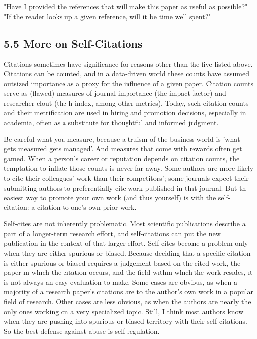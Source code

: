 "Have I provided the references that will make this paper as useful as possible?" "If the reader looks up a given reference, will it be time well spent?"

\subsection*{5.5 More on Self-Citations}
Citations sometimes have significance for reasons other than the five listed above. Citations can be counted, and in a data-driven world these counts have assumed outsized importance as a proxy for the influence of a given paper. Citation counts serve as (flawed) measures of journal importance (the impact factor) and researcher clout (the h-index, among other metrics). Today, such citation counts and their metrification are used in hiring and promotion decisions, especially in academia, often as a substitute for thoughtful and informed judgment.

Be careful what you measure, because a truism of the business world is 'what gets measured gets managed'. And measures that come with rewards often get gamed. When a person's career or reputation depends on citation counts, the temptation to inflate those counts is never far away. Some authors are more likely to cite their colleagues' work than their competitors'; some journals expect their submitting authors to preferentially cite work published in that journal. But th easiest way to promote your own work (and thus yourself) is with the self-citation: a citation to one's own prior work.

Self-cites are not inherently problematic. Most scientific publications describe a part of a longer-term research effort, and self-citations can put the new publication in the context of that larger effort. Self-cites become a problem only when they are either spurious or biased. Because deciding that a specific citation is either spurious or biased requires a judgement based on the cited work, the paper in which the citation occurs, and the field within which the work resides, it is not always an easy evaluation to make. Some cases are obvious, as when a majority of a research paper's citations are to the author's own work in a popular field of research. Other cases are less obvious, as when the authors are nearly the only ones working on a very specialized topic. Still, I think most authors know when they are pushing into spurious or biased territory with their self-citations. So the best defense against abuse is self-regulation.

